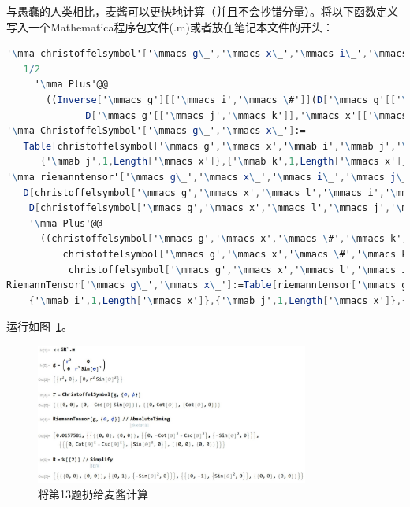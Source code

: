 \begin{xiti}
\begin{jie}
		与愚蠢的人类相比，麦酱可以更快地计算（并且不会抄错分量）。将以下函数定义写入一个Mathematica程序包文件(.m)或者放在笔记本文件的开头：
		\begin{lstlisting}[language=Mathematica]
'\mma christoffelsymbol'['\mmacs g\_','\mmacs x\_','\mmacs i\_','\mmacs j\_','\mmacs k\_']:=
   1/2
     '\mma Plus'@@
       ((Inverse['\mmacs g'][['\mmacs i','\mmacs \#']](D['\mmacs g'[['\mmacs \#','\mmacs j']],'\mmacs x'[['\mmacs k']]]+D['\mmacs g'[['\mmacs k','\mmacs \#']],'\mmacs x'[['\mmacs j']]]-
              D['\mmacs g'[['\mmacs j','\mmacs k']],'\mmacs x'[['\mmacs \#']]]))&)/@'\mma Range'[Length['\mmacs x']];
'\mma ChristoffelSymbol'['\mmacs g\_','\mmacs x\_']:=
   Table[christoffelsymbol['\mmacs g','\mmacs x','\mmab i','\mmab j','\mmab k'],{'\mmab i',1,Length['\mmacs x']},
      {'\mmab j',1,Length['\mmacs x']},{'\mmab k',1,Length['\mmacs x']}];
'\mma riemanntensor'['\mmacs g\_','\mmacs x\_','\mmacs i\_','\mmacs j\_','\mmacs k\_','\mmacs l\_']:=
   D[christoffelsymbol['\mmacs g','\mmacs x','\mmacs l','\mmacs i','\mmacs k'],'\mmacs x'[['\mmacs j']]]-
    D[christoffelsymbol['\mmacs g','\mmacs x','\mmacs l','\mmacs j','\mmacs k'],'\mmacs x'[['\mmacs i']]]+
    '\mma Plus'@@
      ((christoffelsymbol['\mmacs g','\mmacs x','\mmacs \#','\mmacs k','\mmacs i'] christoffelsymbol['\mmacs g','\mmacs x','\mmacs l','\mmacs j','\mmacs \#']-
          christoffelsymbol['\mmacs g','\mmacs x','\mmacs \#','\mmacs k','\mmacs j']
           christoffelsymbol['\mmacs g','\mmacs x','\mmacs l','\mmacs i','\mmacs \#'])&)/@Range[Length['\mmacs x']];
RiemannTensor['\mmacs g\_','\mmacs x\_']:=Table[riemanntensor['\mmacs g','\mmacs x','\mmab i','\mmab j','\mmab k','\mmab l'],
    {'\mmab i',1,Length['\mmacs x']},{'\mmab j',1,Length['\mmacs x']},{'\mmab k',1,Length['\mmacs x']},{'\mmab l',1,Length['\mmacs x']}];
		\end{lstlisting}
		运行如图~\ref{f3.1}。
		\begin{figure}[htb]
			\centering
			\includegraphics[width=0.8\textwidth]{pictures/1}
			\caption{将第13题扔给麦酱计算}\label{f3.1}
		\end{figure}
	\end{jie}


\end{xiti}
